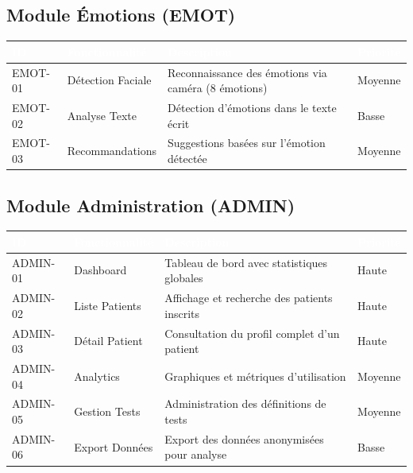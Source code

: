 \documentclass[12pt,a4paper]{report}
\begin{document}
\subsection{Module Émotions (EMOT)}

\begin{longtable}{|p{2cm}|p{4cm}|p{7cm}|p{1.5cm}|}
    \hline
    \rowcolor{emsiblue}\textcolor{white}{\textbf{ID}} & \textcolor{white}{\textbf{Fonctionnalité}} & \textcolor{white}{\textbf{Description}} & \textcolor{white}{\textbf{Priorité}} \\
    \hline
    
    EMOT-01 & Détection Faciale & Reconnaissance des émotions via caméra (8 émotions) & Moyenne \\
    \hline
    EMOT-02 & Analyse Texte & Détection d'émotions dans le texte écrit & Basse \\
    \hline
    EMOT-03 & Recommandations & Suggestions basées sur l'émotion détectée & Moyenne \\
    \hline
\end{longtable}

\subsection{Module Administration (ADMIN)}

\begin{longtable}{|p{2cm}|p{4cm}|p{7cm}|p{1.5cm}|}
    \hline
    \rowcolor{emsiblue}\textcolor{white}{\textbf{ID}} & \textcolor{white}{\textbf{Fonctionnalité}} & \textcolor{white}{\textbf{Description}} & \textcolor{white}{\textbf{Priorité}} \\
    \hline
    
    ADMIN-01 & Dashboard & Tableau de bord avec statistiques globales & Haute \\
    \hline
    ADMIN-02 & Liste Patients & Affichage et recherche des patients inscrits & Haute \\
    \hline
    ADMIN-03 & Détail Patient & Consultation du profil complet d'un patient & Haute \\
    \hline
    ADMIN-04 & Analytics & Graphiques et métriques d'utilisation & Moyenne \\
    \hline
    ADMIN-05 & Gestion Tests & Administration des définitions de tests & Moyenne \\
    \hline
    ADMIN-06 & Export Données & Export des données anonymisées pour analyse & Basse \\
    \hline
\end{longtable}
\end{document}
